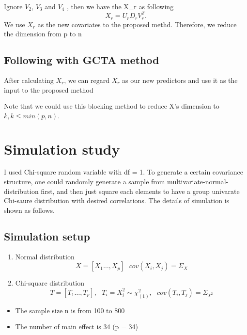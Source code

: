 \documentclass[]{article}
\providecommand{\tightlist}{%
  \setlength{\itemsep}{0pt}\setlength{\parskip}{0pt}}
\begin{document}
Ignore \(V_2\), \(V_3\) and \(V_4\) , then we have the X\_r as following
\[
  X_r = U_rD_rV_r^T.
\] We use \(X_r\) as the new covariates to the proposed methd.
Therefore, we reduce the dimension from p to n

\subsection{Following with GCTA
method}\label{following-with-gcta-method}

After calculating \(X_r\), we can regard \(X_r\) as our new predictors
and use it as the input to the proposed method

Note that we could use this blocking method to reduce X's dimension to
\(k, k \leq min(p,n)\).

\section{Simulation study}\label{simulation-study}

I used Chi-square random variable with df = 1. To generate a certain
covariance structure, one could randomly generate a sample from
multivariate-normal-distribution first, and then just square each
elements to have a group univarate Chi-saure distribution with desired
correlations. The details of simulation is shown as follows.

\subsection{Simulation setup}\label{simulation-setup}

\begin{enumerate}
\def\labelenumi{\arabic{enumi}.}
\item
  Normal distribution\\
  \[
  X = [X_1 \dots, X_p] ~~~ cov(X_i, X_j) = \Sigma_{X}
    \]
\item
  Chi-square distribution\\
  \[
  T = [T_1 \dots, T_p] ,~~~ T_i = X_i^2 \sim \chi_{(1)}^2, ~~~ cov(T_i, T_j) = \Sigma_{\chi^2}
    \]
\end{enumerate}

\begin{itemize}
\tightlist
\item
  The sample size n is from 100 to 800
\item
  The number of main effect is 34 (p = 34)
\end{itemize}
\end{document}
